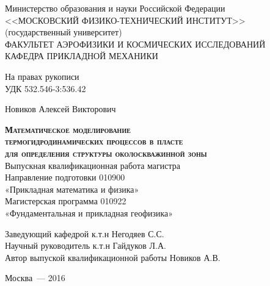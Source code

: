 \begin{titlepage}
\newpage

\begin{center}
	Министерство образования и науки Российской Федерации \\
	<<МОСКОВСКИЙ ФИЗИКО-ТЕХНИЧЕСКИЙ ИНСТИТУТ>>\\(государственный университет)\\[0.5cm]
	ФАКУЛЬТЕТ АЭРОФИЗИКИ И КОСМИЧЕСКИХ ИССЛЕДОВАНИЙ\\
	КАФЕДРА ПРИКЛАДНОЙ МЕХАНИКИ\\
\end{center}

\vspace{0.5em}

\begin{flushright}
На правах рукописи \\
УДК 532.546-3:536.42
\end{flushright}

\vspace{1em}

\begin{center}
	Новиков Алексей Викторович
\end{center}

\vspace{0.5em}

\begin{center}
	\textsc{\textbf{Математическое моделирование\\ 
		термогидродинамических процессов в пласте\\
		для определения структуры околоскважинной зоны}}\\[1cm]
	Выпускная квалификационная работа магистра\\
	Направление подготовки 010900\\
	«Прикладная математика и физика»\\
	Магистерская программа 010922\\
	«Фундаментальная и прикладная геофизика»\\
\end{center}

\vspace{2em}

\begin{flushleft}
	Заведующий кафедрой \hrulefill к.т.н Негодяев С.С.\\[0.5cm]
	Научный руководитель \hrulefill к.т.н Гайдуков Л.А.\\[0.5cm]
	Автор выпуской квалификационной работы \hrulefill Новиков А.В.\\
\end{flushleft}

\vspace{\fill}
\begin{center}
Москва~--- 2016
\end{center}

\end{titlepage}